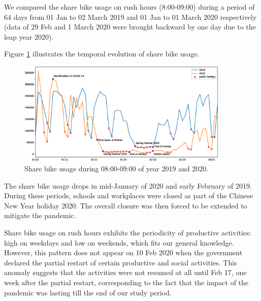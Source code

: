 \documentclass[preprints,ijgi,submit,moreauthors]{Definitions/mdpi}
\begin{document}
We compared the share bike usage on rush hours (8:00-09:00) during a period of 64 days from 01 Jan to 02 March 2019 and 01 Jan to 01 March 2020 respectively (data of 29 Feb and 1 March 2020 were brought backward by one day due to the leap year 2020).


Figure \ref{fig:hour_comparison_8} %
 illustrates the temporal evolution of share bike usage.

\begin{figure}[ht]
    \centering
    \includegraphics[width=0.9\textwidth]{Figures/hour_8.eps}
    \caption{Share bike usage during 08:00-09:00 of year 2019 and 2020.}
    \label{fig:hour_comparison_8}
\end{figure}

The share bike usage drops in mid-January of 2020 and early February of 2019.
During these periods, schools and workplaces were closed as part of the Chinese New Year holiday 2020.
The overall closure was then forced to be extended to mitigate the pandemic.

Share bike usage on rush hours exhibits the periodicity of productive activities: high on weekdays and low on weekends, which fits our general knowledge.
However, this pattern does not appear on 10 Feb 2020 when the government declared the partial restart of certain productive and social activities.
This anomaly suggests that the activities were not resumed at all until Feb 17, one week after the partial restart, corresponding to the fact that the impact of the pandemic was lasting till the end of our study period.
\end{document}
